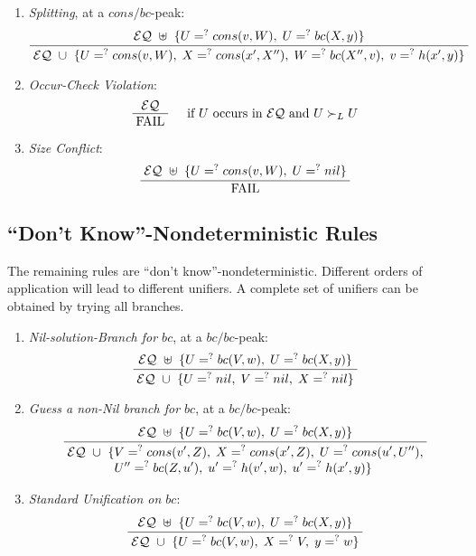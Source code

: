 \documentclass[11pt]{article}
\newcommand{\ueq}{=_{}^?}
\newcommand{\EQ}{\mathcal{EQ}}
\newcommand{\Bc}{\mathit{bc}}
\newcommand{\Cons}{\mathit{cons}}
\newcommand{\Fail}{\mathrm{FAIL}}
\begin{document}
\begin{enumerate}[(L1), align=left, font=\bfseries, start=5]
    \item \emph{Splitting}, at a $\Cons/\Bc$-peak:
        \[\infer
        {\; \EQ ~ \cup ~ \{ U \ueq cons(v, W) , \; X \ueq cons(x', X''), \;
              W \ueq bc(X'', v), \; v \ueq h(x', y) \} \;}
        {\; \EQ ~ \uplus ~ \{ U \ueq cons(v, W), \; U \ueq bc(X, y) \} \;}
        \]

    \item \emph{Occur-Check Violation}:
        \[\infer[\quad \text{if } U \text{ occurs in } \EQ
                 \text{ and }  U \succ_L U]
            {\; \Fail \;}
            {\; \EQ \;}
        \]

    \item \emph{Size Conflict}:
        \[\infer
            {\; \Fail \;}
            {\; \EQ ~ \uplus ~ \{ U \ueq cons(v, W), \; U \ueq nil \} \;}
        \]
\end{enumerate}

\subsection{\texorpdfstring{``Don't Know''}{"Don't Know"}-Nondeterministic Rules}

The remaining rules are ``don't know''-nondeterministic. Different orders of
application will lead to different unifiers. A complete set of unifiers can
be obtained by trying all branches.
\begin{enumerate}[(L1), align=left, font=\bfseries, start=8]
    \item \emph{Nil-solution-Branch for $\Bc$}, at a $\Bc/\Bc$-peak:
        \[\infer
            {\; \EQ ~ \cup ~ \{ U \ueq nil, \; V \ueq nil, \; X \ueq nil \} \;}
            {\; \EQ ~ \uplus ~ \{ U \ueq bc(V, w), \; U \ueq bc(X, y) \} \;}
        \]

    \item \emph{Guess a non-Nil branch for $\Bc$}, at a $\Bc/\Bc$-peak:
        \[\infer
            {\; \begin{aligned}
                \EQ ~ \cup ~ \{
                & V \ueq cons(v', Z), \; X \ueq cons(x', Z), \;
                  U \ueq cons(u', U''), \\[-4pt]
                & U'' \ueq bc(Z, u'), \; u' \ueq h(v', w), \;
                  u' \ueq h(x', y) \}
            \end{aligned} \;}
            {\; \EQ ~ \uplus ~ \{ U \ueq bc(V, w), \; U \ueq bc(X, y) \} \;}
        \]

    \item \emph{Standard Unification on $\Bc$}:
        \[\infer
            {\; \EQ ~ \cup ~ \{ U \ueq bc(V, w), \; X \ueq V, \; y \ueq w \} \;}
            {\; \EQ ~ \uplus ~ \{ U \ueq bc(V, w), \; U \ueq bc(X, y) \} \;}
        \]
\end{enumerate}
\end{document}
